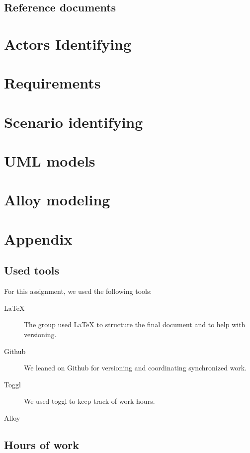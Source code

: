 \documentclass{article}
\begin{document}
		\subsection{Reference documents}

	\newpage
	\section{Actors Identifying}

	\newpage
	\section{Requirements}

	\newpage
	\section{Scenario identifying}

	\newpage
	\section{UML models}

	\newpage
	\section{Alloy modeling}

	\newpage
	\section{Appendix}
		\listoffigures
		\listoftables
		
		\subsection{Used tools}
		For this assignment, we used the following tools:
		
		\begin{description}
			\item [LaTeX] The group used LaTeX to structure the final document and to help with versioning.
			\item [Github] We leaned on Github for versioning and coordinating synchronized work.
			\item [Toggl] We used toggl to keep track of work hours.
			\item [Alloy]
		\end{description}
		
		\subsection{Hours of work}
\end{document}
